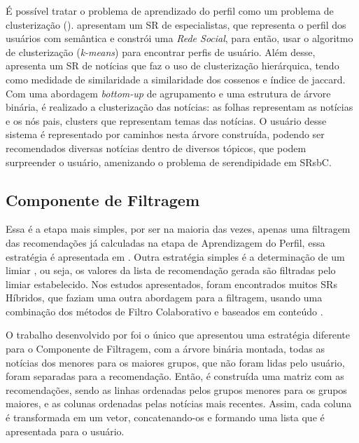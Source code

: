 \documentclass[normaltoc, espacoumemeio, pnumromarab,ruledheader]{abnt}
\begin{document}
É possível tratar o problema de aprendizado do perfil como um problema de clusterização (\cite{Davoodi2012, Bielikova2012}).
 apresentam um SR de especialistas, que representa o perfil dos usuários com semântica e constrói uma \textit{Rede Social}, para então, usar o algoritmo de clusterização (\textit{k-means}) para encontrar perfis de usuário.
Além desse, \cite{Bielikova2012} apresenta um SR de notícias que faz o uso de clusterização hierárquica, tendo como medidade de similaridade a similaridade dos cossenos e índice de jaccard.
Com uma abordagem \textit{bottom-up} de agrupamento e uma estrutura de árvore binária, é realizado a clusterização das notícias: as folhas representam as notícias e os nós pais, clusters que representam temas das notícias.
O usuário desse sistema é representado por caminhos nesta árvore construída, podendo ser recomendados diversas notícias dentro de diversos tópicos, que podem surpreender o usuário, amenizando o problema de serendipidade em SRsbC. 

\subsection{Componente de Filtragem}
\label{subsec:filtragem}

Essa é a etapa mais simples, por ser na maioria das vezes, apenas uma filtragem das recomendações já calculadas na etapa de Aprendizagem do Perfil, essa estratégia é apresentada em \cite{Cleger2012, Qu2012, Wang2012, Davoodi2012, Mannens2011, Semeraro2012}. Outra estratégia simples é a determinação de um limiar \cite{Capelle2012, Lops2013}, ou seja, os valores da lista de recomendação gerada são filtradas pelo limiar estabelecido. Nos estudos apresentados, foram encontrados muitos SRs Híbridos, que faziam uma outra abordagem para a filtragem, usando uma combinação dos métodos de Filtro Colaborativo e baseados em conteúdo \cite{Lops2013, Qu2012, Domingues2012, Spaeth2013, Vaz2012}.

O trabalho desenvolvido por  foi o único que apresentou uma estratégia diferente para o Componente de Filtragem, com a árvore binária montada, todas as notícias dos menores para os maiores grupos, que não foram lidas pelo usuário, foram separadas para a recomendação. Então, é construída uma matriz com as recomendações, sendo as linhas ordenadas pelos grupos menores para os grupos maiores, e as colunas ordenadas pelas notícias mais recentes. Assim, cada coluna é transformada em um vetor, concatenando-os e formando uma lista que é apresentada para o usuário.
\end{document}
